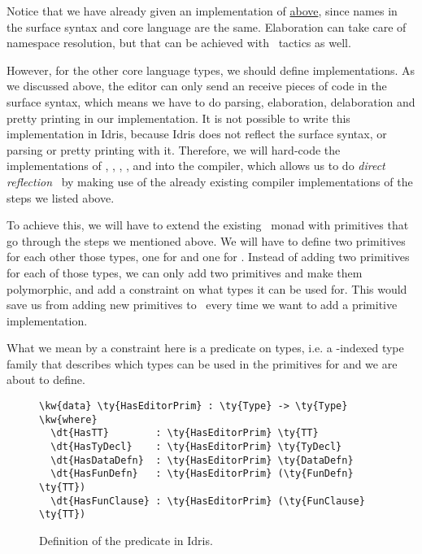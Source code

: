 Notice that we have already given an  implementation of
 \hyperref[code:ttnameEditorable]{above}, since names in the
surface syntax and core language are the same. Elaboration can take care of
namespace resolution, but that can be achieved with \Elab\ tactics as well.

However, for the other core language types, we should define 
implementations. As we discussed above, the editor can only send an receive
pieces of code in the surface syntax, which means we have to do parsing,
elaboration, delaboration and pretty printing in our 
implementation.
It is not possible to write this implementation in Idris,
because Idris does not reflect the surface syntax, or parsing or pretty
printing with it.
Therefore, we will hard-code the implementations of , ,
, , and  into the compiler,
which allows us to do \emph{direct reflection}~\cite{barzilayphd} by making use
of the already existing compiler implementations of the steps we listed above.

To achieve this, we will have to extend the existing \Elab\ monad with
primitives that go through the steps we mentioned above. We will have to define
two primitives for each other those types, one for  and one for
. Instead of adding two primitives for each of those types, we can
only add two primitives and make them polymorphic, and add a constraint on what
types it can be used for. This would save us from adding new primitives to
\Elab\ every time we want to add a primitive  implementation.

What we mean by a constraint here is a predicate on types,
i.e. a -indexed type family that describes which types can be used in
the primitives for  and  we are about to define.

\begin{figure}[ht]
\caption{Definition of the  predicate in Idris.}
\begin{Verbatim}[framesep=2mm, label=\footnotesize{\normalfont{Idris}}, labelposition=topline]
\kw{data} \ty{HasEditorPrim} : \ty{Type} -> \ty{Type} \kw{where}
  \dt{HasTT}        : \ty{HasEditorPrim} \ty{TT}
  \dt{HasTyDecl}    : \ty{HasEditorPrim} \ty{TyDecl}
  \dt{HasDataDefn}  : \ty{HasEditorPrim} \ty{DataDefn}
  \dt{HasFunDefn}   : \ty{HasEditorPrim} (\ty{FunDefn} \ty{TT})
  \dt{HasFunClause} : \ty{HasEditorPrim} (\ty{FunClause} \ty{TT})
\end{Verbatim}
\end{figure}

